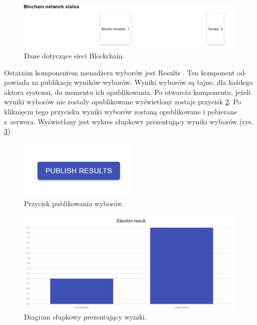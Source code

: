 \documentclass[a4paper,12pt]{book}
\begin{document}
\begin{figure}[H]
	\centering
	\includegraphics[width=\textwidth]{images/bcstatus.png}
	\caption{Dane dotyczące sieci Blockchain.}\label{bcstatus}
\end {figure}

Ostatnim komponentem menadżera wyborów jest
Results
. Ten komponent od-
powiada za publikację wyników wyborów. Wyniki wyborów są tajne, dla każdego
aktora systemu, do momentu ich opublikowania. Po otwarciu komponentu, jeżeli
wyniki wyborów nie zostały opublikowane wyświetlony zostaje przycisk \ref{publish}. Po
kliknięciu tego przycisku wyniki wyborów zostaną opublikowane i pobierane z~serwera. Wyświetlany jest wykres słupkowy prezentujący wyniki wyborów (rys.
\ref{adminelectionresult}).

\begin{figure}[H]
	\centering
	\includegraphics{images/publish.png}
	\caption{Przycisk publikowania wyborów.}\label{publish}
\end {figure}

\begin{figure}[H]
	\centering
	\includegraphics[width=\textwidth]{images/adminelectionresult.png}
	\caption{Diagram słupkowy prezentujący wyniki.}\label{adminelectionresult}
\end {figure}
\end{document}

